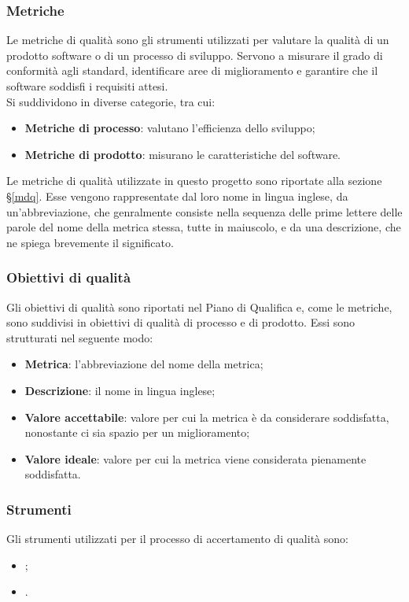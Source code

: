 \subsubsection{Metriche}
Le metriche di qualità sono gli strumenti utilizzati per valutare la qualità di un prodotto software o di un processo di sviluppo. Servono a misurare il grado di conformità agli standard, identificare aree di miglioramento e garantire che il software soddisfi i requisiti attesi. \\
Si suddividono in diverse categorie, tra cui:
\begin{itemize}
    \item \textbf{Metriche di processo}: valutano l’efficienza dello sviluppo;
    \item \textbf{Metriche di prodotto}: misurano le caratteristiche del software.
\end{itemize}
Le metriche di qualità utilizzate in questo progetto sono riportate alla sezione §\ref{mdq}. Esse vengono rappresentate dal loro nome in lingua inglese, da un'abbreviazione, che genralmente consiste nella sequenza delle prime lettere delle parole del nome della metrica stessa, tutte in maiuscolo, e da una descrizione, che ne spiega brevemente il significato.

\subsubsection{Obiettivi di qualità}
Gli obiettivi di qualità sono riportati nel Piano di Qualifica e, come le metriche, sono suddivisi in obiettivi di qualità di processo e di prodotto.
Essi sono strutturati nel seguente modo:
\begin{itemize}
    \item \textbf{Metrica}: l'abbreviazione del nome della metrica;
    \item \textbf{Descrizione}: il nome in lingua inglese;
    \item \textbf{Valore accettabile}: valore per cui la metrica è da considerare soddisfatta, nonostante ci sia spazio per un miglioramento;
    \item \textbf{Valore ideale}: valore per cui la metrica viene considerata pienamente soddisfatta.
\end{itemize}

\subsubsection{Strumenti}
Gli strumenti utilizzati per il processo di accertamento di qualità sono:
\begin{itemize}
    \item {};
    \item {}.
\end{itemize}